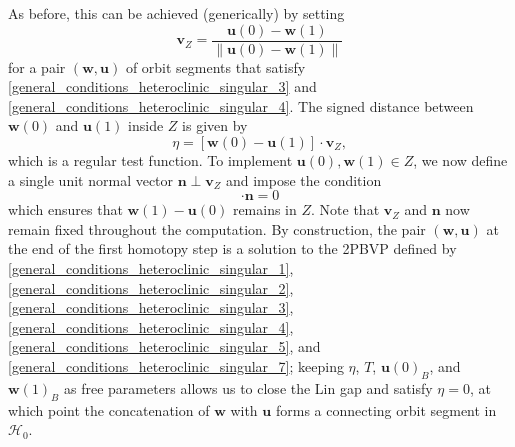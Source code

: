 \documentclass{ws-ijbc}
\begin{document}
As before, this can be achieved (generically) by setting
%
\begin{equation*}
	\mathbf{v}_Z = \frac{\mathbf{u}(0) - \mathbf{w}(1)}{\left\lVert \mathbf{u}(0) - \mathbf{w}(1) \right\lVert}
	\label{Lin_vector_singular}
\end{equation*}
%
for a pair $(\mathbf{w},\mathbf{u})$ of orbit segments that satisfy \eqref{general_conditions_heteroclinic_singular_3} and \eqref{general_conditions_heteroclinic_singular_4}.  The signed distance between $\mathbf{w}(0)$ and $\mathbf{u}(1)$ inside $Z$ is given by
%
\begin{equation}
	\eta = [ \mathbf{w}(0)-\mathbf{u}(1) ] \cdot \mathbf{v}_Z,
	\label{general_conditions_heteroclinic_singular_5}
\end{equation}
%
which is a regular test function.  To implement $\mathbf{u}(0), \mathbf{w}(1) \in Z$, we now define a single unit normal vector $\mathbf{n} \perp \mathbf{v}_Z$ and impose the condition
%
\begin{equation}
	[\mathbf{u}(0) - \mathbf{w}(1)] \cdot \mathbf{n} =0
	\label{general_conditions_heteroclinic_singular_7}
\end{equation}
%
which ensures that $\mathbf{w}(1)-\mathbf{u}(0)$ remains in $Z$.  Note that $\mathbf{v}_Z$ and $\mathbf{n}$ now remain fixed throughout the computation.  By construction, the pair $(\mathbf{w}, \mathbf{u})$ at the end of the first homotopy step is a solution to the 2PBVP defined by \eqref{general_conditions_heteroclinic_singular_1}, \eqref{general_conditions_heteroclinic_singular_2}, \eqref{general_conditions_heteroclinic_singular_3}, \eqref{general_conditions_heteroclinic_singular_4}, \eqref{general_conditions_heteroclinic_singular_5}, and \eqref{general_conditions_heteroclinic_singular_7}; keeping $\eta$, $T$, $\mathbf{u}(0)_B$, and $\mathbf{w}(1)_B$ as free parameters allows us to close the Lin gap and satisfy $\eta = 0$, at which point the concatenation of $\mathbf{w}$ with $\mathbf{u}$ forms a connecting orbit segment in $\mathscr{H}_0$.
\end{document}
